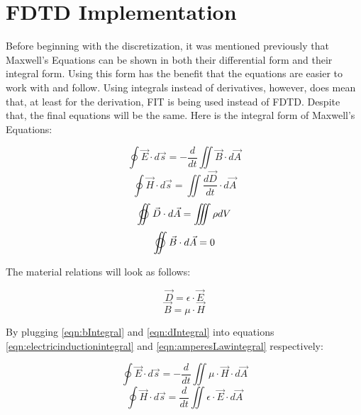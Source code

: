 \section{FDTD Implementation}

Before beginning with the discretization, it was mentioned previously that Maxwell's Equations can be shown in both their differential form and their integral form. Using this form has the benefit that the equations are easier to work with and follow. Using integrals instead of derivatives, however, does mean that, at least for the derivation, FIT is being used instead of FDTD. Despite that, the final equations will be the same. Here is the integral form of Maxwell's Equations:


\begin{equation}
	\label{eqn:electricinductionintegral}
	\oint \vec{E} \cdot d\vec{s} = - \frac{d}{dt} \iint \vec{B} \cdot d\vec{A}
\end{equation}
\begin{equation}
	\label{eqn:amperesLawintegral}
	\oint \vec{H} \cdot d\vec{s} = \iint \frac{d\vec{D}}{dt} \cdot d\vec{A}
\end{equation}
\begin{equation}
	\label{eqn:magneticDivergenceintegral}
	\varoiint \vec{D} \cdot d\vec{A} = \iiint \rho dV
\end{equation}
\begin{equation}
	\label{eqn:gausslawintegral}
	\varoiint \vec{B} \cdot d\vec{A} = 0
\end{equation}

The material relations will look as follows:

\begin{equation}
	\label{eqn:dIntegral}
	\vec{D} = \epsilon \cdot \vec{E}
\end{equation}
\begin{equation}
	\label{eqn:bIntegral}
	\vec{B} = \mu \cdot \vec{H}
\end{equation}

By plugging \ref{eqn:bIntegral} and \ref{eqn:dIntegral} into equations \ref{eqn:electricinductionintegral} and \ref{eqn:amperesLawintegral} respectively:

\begin{equation}
	\label{eqn:electricUpdateIntegral}
	\oint \vec{E} \cdot d\vec{s} = - \frac{d}{dt} \iint \mu \cdot \vec{H} \cdot d\vec{A}
\end{equation}
\begin{equation}
	\label{eqn:magneticUpdateIntegral}
	\oint \vec{H} \cdot d\vec{s} = \frac{d}{dt} \iint \epsilon \cdot \vec{E} \cdot d\vec{A}
\end{equation}

